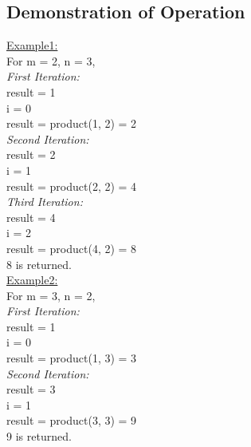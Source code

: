 \documentclass[a4paper,12pt]{article}
\begin{document}
    \subsection{Demonstration of Operation}
    \underline{Example1:}\\
    For m = 2, n = 3,\\
    \textit{First Iteration:}\\
    result = 1\\
    i = 0\\
    result = product(1, 2) = 2\\
    \textit{Second Iteration:}\\
    result = 2\\
    i = 1\\
    result = product(2, 2) = 4\\
    \textit{Third Iteration:}\\
    result = 4\\
    i = 2\\
    result = product(4, 2) = 8\\
    8 is returned.\\
    \underline{Example2:}\\
    For m = 3, n = 2,\\
    \textit{First Iteration:}\\
    result = 1\\
    i = 0\\
    result = product(1, 3) = 3\\
    \textit{Second Iteration:}\\
    result = 3\\
    i = 1\\
    result = product(3, 3) = 9\\
    9 is returned.
\end{document}
